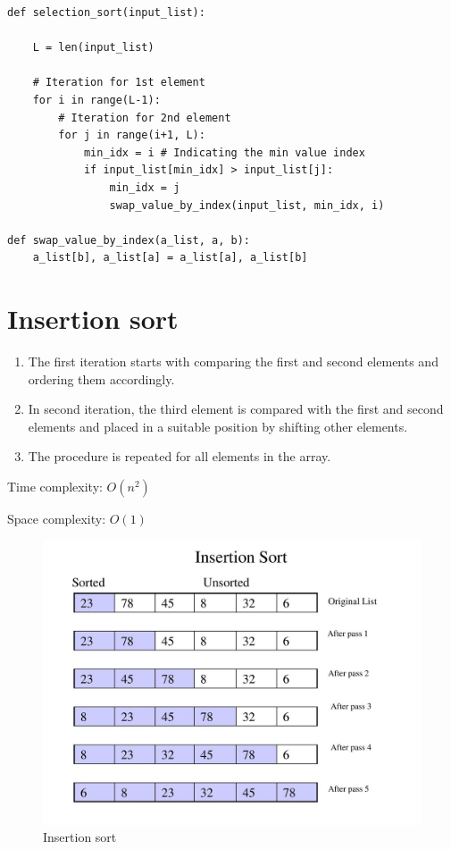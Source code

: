 \documentclass[a4paper,11pt]{book}
\begin{document}
\begin{lstlisting}
def selection_sort(input_list):

    L = len(input_list)
    
    # Iteration for 1st element
    for i in range(L-1): 
        # Iteration for 2nd element
        for j in range(i+1, L): 
            min_idx = i # Indicating the min value index
            if input_list[min_idx] > input_list[j]:
                min_idx = j
                swap_value_by_index(input_list, min_idx, i)
                
def swap_value_by_index(a_list, a, b):
    a_list[b], a_list[a] = a_list[a], a_list[b]
\end{lstlisting}

\newpage
\section{Insertion sort}

\begin{enumerate}
	\item The first iteration starts with comparing the first and second elements and ordering them accordingly.
	\item In second iteration, the third element is compared with the first and second elements and placed in a suitable position by shifting other elements.
	\item The procedure is repeated for all elements in the array.
\end{enumerate}

\noindent Time complexity: $O(n^2)$

\noindent Space complexity: $O(1)$

\begin{figure}[ht]
	\centering
	\includegraphics[scale=1.2]{code/sort/pic/picinsertion.jpg}
	\caption{Insertion sort}
\end{figure}
\end{document}

